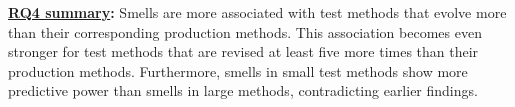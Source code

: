 

\begin{tcolorbox}
\noindent\textbf{\underline{RQ4 summary}:}
Smells are more associated with test methods that evolve more than their corresponding production methods. This association becomes even stronger for test methods that are revised at least five more times than their production methods. Furthermore, smells in small test methods show more predictive power than smells in large methods, contradicting earlier findings.
\end{tcolorbox}

